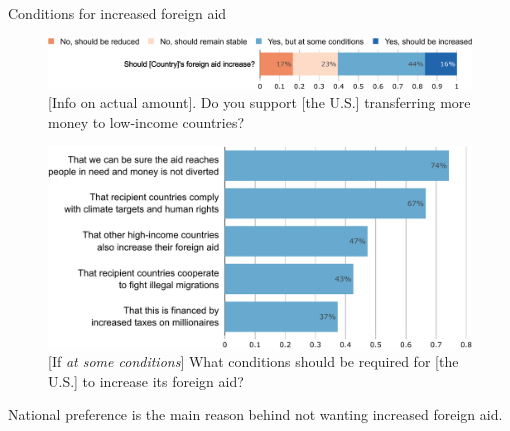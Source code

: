 \begin{framefont}{\small}
\begin{frame}{Conditions for increased foreign aid\label{}}
    \begin{figure} \vspace{-.2cm}
        \centering 
        \caption{[Info on actual amount]. Do you support [the U.S.] transferring more money to low-income countries?}\vspace{-.2cm}
        \includegraphics[width=.7\textwidth]{../figures/all/foreign_aid_raise_support.pdf} 
    \end{figure}\vspace{-.2cm} \pause
    \begin{figure} 
        \centering 
        \caption{[If \textit{at some conditions}] What conditions should be required for [the U.S.] to increase its foreign aid?}\vspace{-.2cm}
        \includegraphics[height=.48\textheight]{../figures/all/foreign_aid_condition.pdf} 
    \end{figure} \pause \vspace{-.3cm}
	\bbvs \ip {}%
	\ip National preference is the main reason behind not wanting increased foreign aid.
	\ee 
\end{frame}


\end{framefont}
